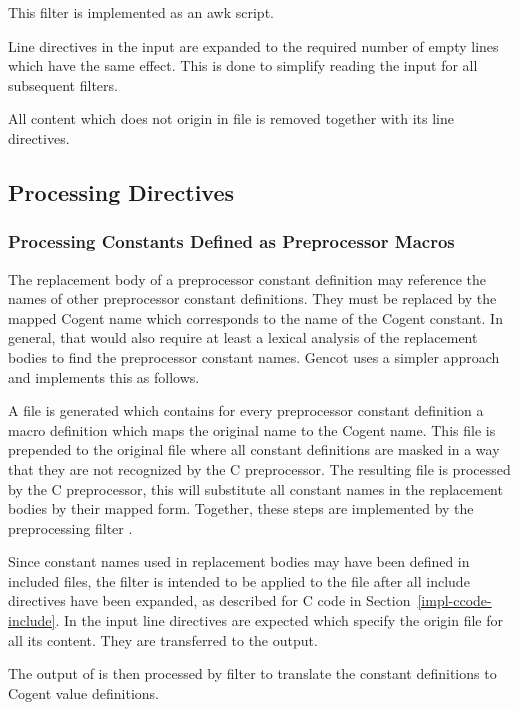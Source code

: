 This filter is implemented as an awk script.

Line directives in the input are expanded to the required number of empty lines
which have the same effect. This is done to simplify reading the input for all subsequent filters.

All content which does not origin in file  is removed together with its line directives.

\subsection{Processing Directives}

\subsubsection{Processing Constants Defined as Preprocessor Macros}

The replacement body of a preprocessor constant definition may reference the names of other preprocessor
constant definitions. They must be replaced by the mapped Cogent name which corresponds to the name of
the Cogent constant. In general, that would also require at least a lexical analysis of the replacement
bodies to find the preprocessor constant names. Gencot uses a simpler approach and implements this as follows.

A file is generated which contains for every preprocessor constant definition a macro definition 
which maps the original name to the Cogent name. This file is prepended to the original file where all
constant definitions are masked in a way that they are not recognized by the C preprocessor.
The resulting file is processed by the C preprocessor, this will substitute all constant names in the replacement 
bodies by their mapped form. Together, these steps are implemented by the preprocessing filter 
.

Since constant names used in replacement bodies may have been defined in included files, the filter
 is intended to be applied to the file after all include directives have been 
expanded, as described for C code in Section~\ref{impl-ccode-include}. In the input line directives
are expected which specify the origin file for all its content. They are transferred to the output.

The output of  is then processed by
filter  to translate the constant definitions to Cogent value definitions.


